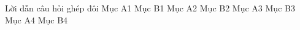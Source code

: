 \begin{ex}%
[XX.Y] %
{\begin{tikzpicture}
\end{tikzpicture}}
\end{ex}


\begin{ex}%
Lời dẫn câu hỏi ghép đôi
\matching
{Mục A1} {Mục B1}
{Mục A2} {Mục B2}
{Mục A3} {Mục B3}
{Mục A4} {Mục B4}
\end{ex}
















